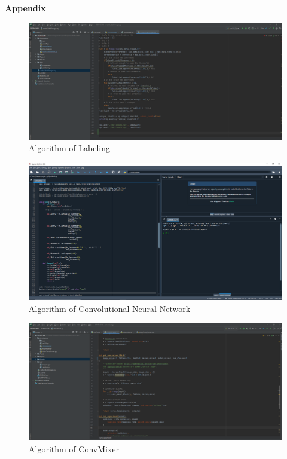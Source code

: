 \documentclass{article}
\begin{document}
\begin{center}
    \textbf{\Large Appendix}
\end{center}
\begin{figure}[H]
\begin{center}
    \includegraphics[scale=0.18]{assets/appendix/image_creation_alg.png}
    \caption{Algorithm of Labeling}
\end{center}
\end{figure}
\noindent
\begin{figure}[H]
\begin{center}
    \includegraphics[scale=0.18]{assets/appendix/cnn_implemantation.png}
    \caption{Algorithm of Convolutional Neural Network}
\end{center}
\end{figure}
\noindent
\begin{figure}[H]
\begin{center}
    \includegraphics[scale=0.18]{assets/appendix/convmixer_implemantation.png}
    \caption{Algorithm of ConvMixer}
\end{center}
\end{figure}
\end{document}
